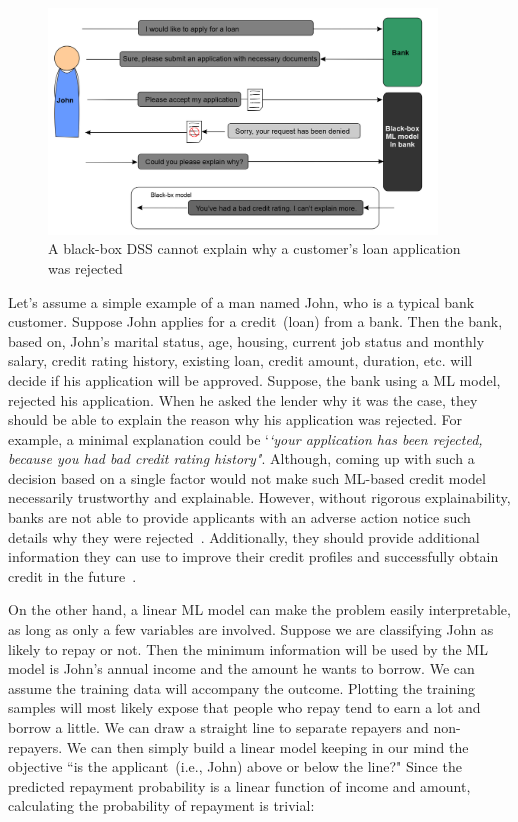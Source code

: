 \vspace{-4mm}
\begin{figure}[h]
	\centering
	\includegraphics[width=0.8\linewidth,height=60mm]{images/loan.png}
	\caption{A black-box DSS cannot explain why a customer's loan application was rejected}
    \label{fig:model_bbm}
    \vspace{-2mm}
\end{figure}

\hspace*{3.5mm} Let's assume a simple example of a man named John, who is a typical bank customer. Suppose John applies for a credit~(loan) from a bank.
Then the bank, based on, John's marital status, age, housing, current job status and monthly salary, credit rating history, existing loan, credit amount, duration, etc. will decide if his application will be approved. Suppose, the bank using a ML model, rejected his application. When he asked the lender why it was the case, they should be able to explain the reason why his application was rejected. For example, a minimal explanation could be `\textit{`your application has been rejected, because you had bad credit rating history"}. Although, coming up with such a decision based on a single factor would not make such ML-based credit model necessarily trustworthy and explainable.
However, without rigorous explainability, banks are not able to provide applicants with an adverse action notice such details why they were rejected~\cite{hall2020responsible}. Additionally, they should provide additional information they can use to improve their credit profiles and successfully obtain credit in the future~\cite{hall2020responsible}. 

\hspace*{3.5mm} On the other hand, a linear ML model can make the problem easily interpretable, as long as only a few variables are involved. Suppose we are classifying John as likely to repay or not. Then the minimum information will be used by the ML model is John's annual income and the amount he wants to borrow. We can assume the training data will accompany the outcome. Plotting the training samples will most likely expose that people who repay tend to earn a lot and borrow a little. We can draw a straight line to separate repayers and non-repayers. We can then simply build a linear model keeping in our mind the objective ``is the applicant~(i.e., John) above or below the line?" Since the predicted repayment probability is a linear function of income and amount, calculating the probability of repayment is trivial: 

